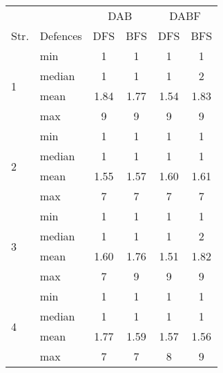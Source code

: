 \begin{table}
\centering
\begin{tabular}{l|l|c|c|c|c}
\multicolumn{2}{l|}{}         & \multicolumn{2}{c|}{DAB} & \multicolumn{2}{c}{DABF}  \\ 
\cline{3-6}
Str.               & Defences & DFS  & BFS               & DFS  & BFS                \\ 
\hline
\multirow{4}{*}{1} & min      & 1    & 1                 & 1    & 1                  \\
                   & median   & 1    & 1                 & 1    & 2                  \\
                   & mean     & 1.84 & 1.77              & 1.54 & 1.83               \\
                   & max      & 9    & 9                 & 9    & 9                  \\ 
\hline
\multirow{4}{*}{2} & min      & 1    & 1                 & 1    & 1                  \\
                   & median   & 1    & 1                 & 1    & 1                  \\
                   & mean     & 1.55 & 1.57              & 1.60 & 1.61               \\
                   & max      & 7    & 7                 & 7    & 7                  \\ 
\hline
\multirow{4}{*}{3} & min      & 1    & 1                 & 1    & 1                  \\
                   & median   & 1    & 1                 & 1    & 2                  \\
                   & mean     & 1.60 & 1.76              & 1.51 & 1.82               \\
                   & max      & 7    & 9                 & 9    & 9                  \\ 
\hline
\multirow{4}{*}{4} & min      & 1    & 1                 & 1    & 1                  \\
                   & median   & 1    & 1                 & 1    & 1                  \\
                   & mean     & 1.77 & 1.59              & 1.57 & 1.56               \\
                   & max      & 7    & 7                 & 8    & 9                 
\end{tabular}
\end{table}